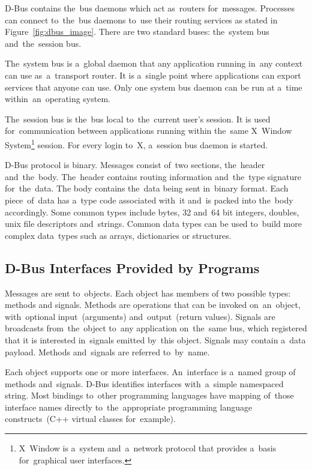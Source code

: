 \documentclass[conference]{IEEEtran}
\begin{document}
D-Bus contains the~bus daemons which act as~routers for~messages. Processes
can connect to~the~bus daemons to~use their routing services as stated
in Figure~\ref{fig:dbus_image}. There are two standard buses:
the~system bus and~the~session bus.


The~system bus is a~global daemon that any application running in~any
context can use as~a~transport router. It is a~single point where applications
can export services that anyone can use. Only one system bus daemon
can be run at a~time within~an~operating system.


The~session bus is the~bus local to~the~current user's session. It is used
for~communication between applications running within the~same X~Window
System\footnote{X~Window is a~system and~a~network protocol that provides
a~basis for~graphical user interfaces.} session. For every login to~X,
a~session bus daemon is started.


D-Bus protocol is binary. Messages consist of~two sections, the~header
and~the~body. The~header contains routing information and~the~type signature
for~the~data. The body contains the~data being sent in~binary format. Each
piece~of~data has a~type code \mbox{associated} with~it and~is packed into the~body
accordingly. Some common types include bytes, 32 and~64 bit integers, doubles,
unix file descriptors and~strings. Common data types can be used to~build more
complex data~types such as arrays, dictionaries or structures.


\subsection{D-Bus Interfaces Provided by Programs}
Messages are sent to~objects. Each object has members of two possible types:
methods and signals.  Methods are operations that can be invoked on~an~object,
with~optional input~(arguments) and~output~(return values).  Signals are
broadcasts from~the~object to~any application on~the~same bus, which registered
that it is interested in~signals emitted by~this object. Signals may contain
a~data payload. Methods and~signals are referred to~by~name.


Each object supports one or more interfaces. An~interface is a~named group
of methods and~signals. D-Bus identifies interfaces with~a~simple namespaced string.
Most bindings to~other programming languages have mapping of~those interface names
directly to~the~appropriate programming language constructs~(C++ virtual classes
for~example).
\end{document}

